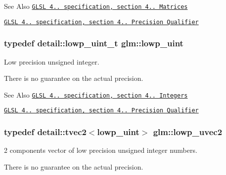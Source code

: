 \begin{DoxySeeAlso}{See Also}
\href{http://www.opengl.org/registry/doc/GLSLangSpec.4.20.8.pdf}{\tt G\-L\-S\-L 4.. specification, section 4.. Matrices} 

\href{http://www.opengl.org/registry/doc/GLSLangSpec.4.20.8.pdf}{\tt G\-L\-S\-L 4.. specification, section 4.. Precision Qualifier} 
\end{DoxySeeAlso}
\hypertarget{group__core__precision_ga8077c90f2c87e419ea6c273157dcc1fc}{
\subsubsection[{lowp\-\_\-uint}]{\setlength{\rightskip}{0pt plus 5cm}typedef detail\-::lowp\-\_\-uint\-\_\-t {\bf glm\-::lowp\-\_\-uint}}}\label{group__core__precision_ga8077c90f2c87e419ea6c273157dcc1fc}


Low precision unsigned integer. 

There is no guarantee on the actual precision.

\begin{DoxySeeAlso}{See Also}
\href{http://www.opengl.org/registry/doc/GLSLangSpec.4.20.8.pdf}{\tt G\-L\-S\-L 4.. specification, section 4.. Integers} 

\href{http://www.opengl.org/registry/doc/GLSLangSpec.4.20.8.pdf}{\tt G\-L\-S\-L 4.. specification, section 4.. Precision Qualifier} 
\end{DoxySeeAlso}
\hypertarget{group__core__precision_gacae56e02818d0da34e70ac934807388c}{
\subsubsection[{lowp\-\_\-uvec2}]{\setlength{\rightskip}{0pt plus 5cm}typedef detail\-::tvec2$<$lowp\-\_\-uint$>$ {\bf glm\-::lowp\-\_\-uvec2}}}\label{group__core__precision_gacae56e02818d0da34e70ac934807388c}


2 components vector of low precision unsigned integer numbers. 

There is no guarantee on the actual precision.

